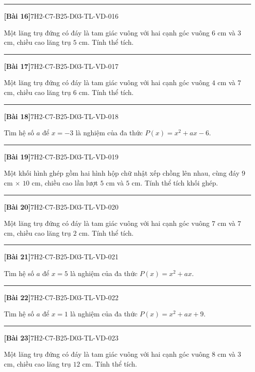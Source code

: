 \documentclass[12pt,a4paper]{article}
\newif\ifloigiai
\newenvironment{cauhoi}[2]{%
  \par\medskip\noindent\rule{\textwidth}{0.4pt}\par\nopagebreak
  \noindent\textbf{[#1]}\hfill{\scriptsize\ttfamily #2}\par\nopagebreak\smallskip}{\par}
\newcommand{\loigiai}[1]{\ifloigiai\par\smallskip\noindent\textit{Lời giải.} #1\par\fi}
\begin{document}
\begin{cauhoi}{Bài 16}{7H2-C7-B25-D03-TL-VD-016}
Một lăng trụ đứng có đáy là tam giác vuông với hai cạnh góc vuông $6$ cm và $3$ cm, chiều cao lăng trụ $5$ cm. Tính thể tích.
\loigiai{Diện tích đáy là $\dfrac{6\cdot 3}{2}=9$ ($\text{cm}^2$). Thể tích là $9\cdot 5=45$ ($\text{cm}^3$).}
\end{cauhoi}
\begin{cauhoi}{Bài 17}{7H2-C7-B25-D03-TL-VD-017}
Một lăng trụ đứng có đáy là tam giác vuông với hai cạnh góc vuông $4$ cm và $7$ cm, chiều cao lăng trụ $6$ cm. Tính thể tích.
\loigiai{Diện tích đáy là $\dfrac{4\cdot 7}{2}=14$ ($\text{cm}^2$). Thể tích là $14\cdot 6=84$ ($\text{cm}^3$).}
\end{cauhoi}
\begin{cauhoi}{Bài 18}{7H2-C7-B25-D03-TL-VD-018}
Tìm hệ số $a$ để $x=-3$ là nghiệm của đa thức $P(x)=x^{2}+ax-6$.
\loigiai{$x=-3$ là nghiệm nên $P(-3)=0$: $9-3\cdot a-6=0$ nên $-3a=-3$, suy ra $a=1$.}
\end{cauhoi}
\begin{cauhoi}{Bài 19}{7H2-C7-B25-D03-TL-VD-019}
Một khối hình ghép gồm hai hình hộp chữ nhật xếp chồng lên nhau, cùng đáy $9$ cm $\times$ $10$ cm, chiều cao lần lượt $5$ cm và $5$ cm. Tính thể tích khối ghép.
\loigiai{Thể tích hai khối là $9\cdot 10\cdot 5=450$ và $9\cdot 10\cdot 5=450$ ($\text{cm}^3$). Thể tích khối ghép là $450+450=900$ ($\text{cm}^3$).}
\end{cauhoi}
\begin{cauhoi}{Bài 20}{7H2-C7-B25-D03-TL-VD-020}
Một lăng trụ đứng có đáy là tam giác vuông với hai cạnh góc vuông $7$ cm và $7$ cm, chiều cao lăng trụ $2$ cm. Tính thể tích.
\loigiai{Diện tích đáy là $\dfrac{7\cdot 7}{2}=24,5$ ($\text{cm}^2$). Thể tích là $24,5\cdot 2=49$ ($\text{cm}^3$).}
\end{cauhoi}
\begin{cauhoi}{Bài 21}{7H2-C7-B25-D03-TL-VD-021}
Tìm hệ số $a$ để $x=5$ là nghiệm của đa thức $P(x)=x^{2}+ax$.
\loigiai{$x=5$ là nghiệm nên $P(5)=0$: $25+5\cdot a=0$ nên $5a=-25$, suy ra $a=-5$.}
\end{cauhoi}
\begin{cauhoi}{Bài 22}{7H2-C7-B25-D03-TL-VD-022}
Tìm hệ số $a$ để $x=1$ là nghiệm của đa thức $P(x)=x^{2}+ax+9$.
\loigiai{$x=1$ là nghiệm nên $P(1)=0$: $1+1\cdot a+9=0$ nên $a=-10$, suy ra $a=-10$.}
\end{cauhoi}
\begin{cauhoi}{Bài 23}{7H2-C7-B25-D03-TL-VD-023}
Một lăng trụ đứng có đáy là tam giác vuông với hai cạnh góc vuông $8$ cm và $3$ cm, chiều cao lăng trụ $12$ cm. Tính thể tích.
\loigiai{Diện tích đáy là $\dfrac{8\cdot 3}{2}=12$ ($\text{cm}^2$). Thể tích là $12\cdot 12=144$ ($\text{cm}^3$).}
\end{cauhoi}
\end{document}
